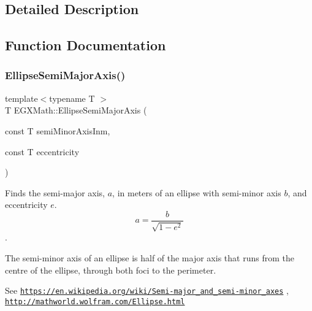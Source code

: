 \subsection{Detailed Description}


\subsection{Function Documentation}
\mbox{\label{group___e_g_x_math-_geometry-2_d-_ellipse-_semi_major_axis_ga646a2ca065f4ac3f666a9ea22f3bb527}} 
\subsubsection{\texorpdfstring{Ellipse\+Semi\+Major\+Axis()}{EllipseSemiMajorAxis()}}
{\footnotesize\ttfamily template$<$typename T $>$ \\
T E\+G\+X\+Math\+::\+Ellipse\+Semi\+Major\+Axis (\begin{DoxyParamCaption}\item[{const T}]{semi\+Minor\+Axis\+Inm,  }\item[{const T}]{eccentricity }\end{DoxyParamCaption})}



Finds the semi-\/major axis, $a$, in meters of an ellipse with semi-\/minor axis $b$, and eccentricity $e$. \[ a=\frac{b}{\sqrt{1-e^2}} \]. 

The semi-\/minor axis of an ellipse is half of the major axis that runs from the centre of the ellipse, through both foci to the perimeter.

See \href{https://en.wikipedia.org/wiki/Semi-major_and_semi-minor_axes}{\tt https\+://en.\+wikipedia.\+org/wiki/\+Semi-\/major\+\_\+and\+\_\+semi-\/minor\+\_\+axes} , \href{http://mathworld.wolfram.com/Ellipse.html}{\tt http\+://mathworld.\+wolfram.\+com/\+Ellipse.\+html}


